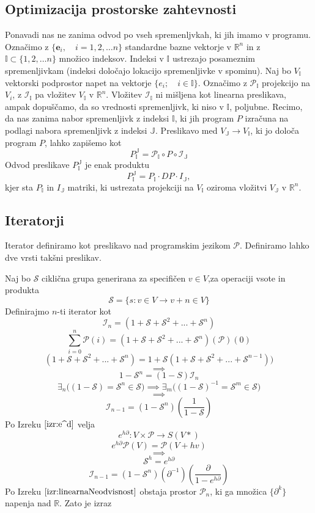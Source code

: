 \documentclass{article}
\newcommand{\RR}{\mathbb{R}}
\newcommand{\Shift}{\mathcal{S}}
\newcommand{\II}{\mathbb{I}}
\newcommand{\JJ}{\mathbb{J}}
\newcommand{\e}{\mathbf{e}}
\newcommand{\dP}{\mathcal{P}}
\newcommand{\D}{\partial}
\begin{document}
\subsection{Optimizacija prostorske zahtevnosti}
 Ponavadi nas ne zanima odvod po vseh spremenljvkah, ki jih imamo v programu.
 Označimo z $\{\e_i,\quad i=1,2,\ldots n\}$ standardne bazne vektorje v $\RR^n$ in z
 $\II\subset\{1,2,\ldots n\}$ množico indeksov. Indeksi v $\II$ ustrezajo
 posameznim spremenljivkam (indeksi določajo lokacijo spremenljivke v spominu). Naj bo $V_\II$ vektorski
 podprostor napet na vektorje $\{e_i;\quad i\in\II\}$. Označimo z 
 $\mathcal{P}_\II$ projekcijo na $V_i$, z $\mathcal{I}_\II$ pa vložitev $V_\II$ v
 $\RR^n$. Vložitev $\mathcal{I}_\II$ ni mišljena kot linearna preslikava, ampak
 dopuščamo, da so vrednosti spremenljivk, ki niso v $\II$, poljubne. Recimo, da nas zanima nabor spremenljivk z indeksi $\II$, ki jih
 program $P$ izračuna na podlagi nabora spremenljivk z indeksi $\mathbb{J}$.
 Preslikavo med $V_\JJ\to V_\II$, ki jo določa program $P$, lahko zapišemo kot
 \begin{equation}
   \label{eq:zozitev}
   P^{\JJ}_{\II}=\mathcal{P}_\II\circ P\circ \mathcal{I}_\JJ 
 \end{equation}
 Odvod preslikave $ P^{\JJ}_{\II}$ je enak produktu
 \begin{equation*}
   P^{\JJ}_{\II}=P_\II\cdot DP\cdot I_\JJ,   
 \end{equation*}
 kjer sta $P_\II$ in  $I_\JJ$ matriki, ki ustrezata projekciji na $V_\II$ oziroma
 vložitvi $V_\JJ$ v $\RR^n$.  
 
 \subsection{Iteratorji}
 
 Iterator definiramo kot preslikavo nad programskim jezikom $\dP$. Definiramo lahko dve vrsti takšni preslikav.
 
 Naj bo $\Shift$ ciklična grupa generirana za specifičen $v\in V$,za operaciji vsote in produkta
 $$\Shift=\{s:v\in V\to v+n\in V\}$$
 Definirajmo $n$-ti iterator kot
 $$\mathcal{I}_n=(1+\Shift+\Shift^2+...+\Shift^n)$$
 $$\sum\limits_{i=0}^{n}\dP(i)=(1+\Shift+\Shift^2+...+\Shift^n)(\dP)(0)$$
 $$(1+\Shift+\Shift^2+...+\Shift^n)=1+\Shift(1+\Shift+\Shift^2+...+\Shift^{n-1}))$$
 $$\implies$$
 $$1-\Shift^n=(1-S)\mathcal{I}_n$$
 $$\exists_n\Big((1-\Shift)=\Shift^n\in\Shift\Big)\implies \exists_m\Big((1-\Shift)^{-1}=\Shift^m\in \Shift\Big)$$
 $$\implies$$
 $$\mathcal{I}_{n-1}=(1-\Shift^n)(\frac{1}{1-\Shift})$$
 Po Izreku $\ref{izr:e^d}$ velja
 $$e^{h\D}:V\times\dP\to S(V*)$$
 $$e^{h\D}\dP(V)=\dP(V+hv)$$
 $$\implies$$
 $$\Shift^h=e^{h\D}$$
 $$\mathcal{I}_{n-1}=(1-\Shift^n)(\D^{-1})(\frac{\D}{1-e^{h\D}})$$
 Po Izreku $\ref{izr:linearnaNeodvisnost}$  obstaja prostor $\dP_n$, ki ga množica $\{\D^k\}$ napenja nad $\RR$. Zato je izraz   
   
\end{document}
